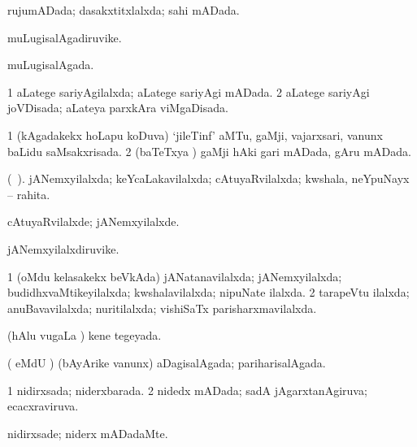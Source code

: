 \bentry
{} 
\gl{\gu}
\expl{}
\bmng
rujumADada; dasakxtitxlalxda; sahi mADada. 
\emng
\eentry

\bentry
{} 
\gl{\nA}
\expl{}
\bmng
muLugisalAgadiruvike. 
\emng
\eentry

\bentry
{} 
\gl{\gu}
\expl{}
\bmng
muLugisalAgada. 
\emng
\eentry

\bentry
{} 
\gl{\gu}
\expl{}
\bmng
\bnum
\num{1} aLatege sariyAgilalxda; aLatege sariyAgi mADada. 
\num{2} aLatege sariyAgi joVDisada; aLateya parxkAra viMgaDisada. 
\enum
\emng
\eentry

\bentry
{} 
\gl{\gu}
\expl{}
\bmng
\bnum
\num{1} (kAgadakekx hoLapu koDuva) `jileTinf' aMTu, gaMji, vajarxsari, \mo vanunx baLidu saMsakxrisada. 
\num{2} (baTeTxya \vi) gaMji hAki gari mADada, gAru mADada. 
\enum
\emng
\eentry

\bentry
{} 
\gl{\gu}
\expl{}
\bmng
(\ame\ ). jANemxyilalxda; keYcaLakavilalxda; cAtuyaRvilalxda; kwshala, neYpuNayx -- rahita. 
\emng
\eentry

\bentry
{} 
\gl{\kirxvi}
\expl{}
\bmng
cAtuyaRvilalxde; jANemxyilalxde. 
\emng
\eentry

\bentry
{} 
\gl{\nA}
\expl{}
\bmng
jANemxyilalxdiruvike. 
\emng
\eentry

\bentry
{} 
\gl{\gu}
\expl{}
\bmng
\bnum
\num{1} (oMdu kelasakekx beVkAda) jANatanavilalxda; jANemxyilalxda; budidhxvaMtikeyilalxda; kwshalavilalxda; nipuNate ilalxda. 
\num{2} tarapeVtu ilalxda; anuBavavilalxda; nuritilalxda; vishiSaTx parisharxmavilalxda. 
\enum
\emng
\eentry

\bentry
{} 
\gl{\gu}
\expl{}
\bmng
(hAlu \mo vugaLa \vi) kene tegeyada. 
\emng
\eentry

\bentry
{} 
\gl{\gu}
\expl{}
\bmng
( eMdU \parx) (bAyArike \mo vanunx) aDagisalAgada; pariharisalAgada. 
\emng
\eentry

\bentry
{} 
\gl{\gu}
\expl{}
\bmng
\bnum
\num{1} nidirxsada; niderxbarada. 
\num{2} nidedx mADada; sadA jAgarxtanAgiruva; ecacxraviruva. 
\enum
\emng
\eentry

\bentry
{} 
\gl{\kirxvi}
\expl{}
\bmng
nidirxsade; niderx mADadaMte. 
\emng
\eentry

